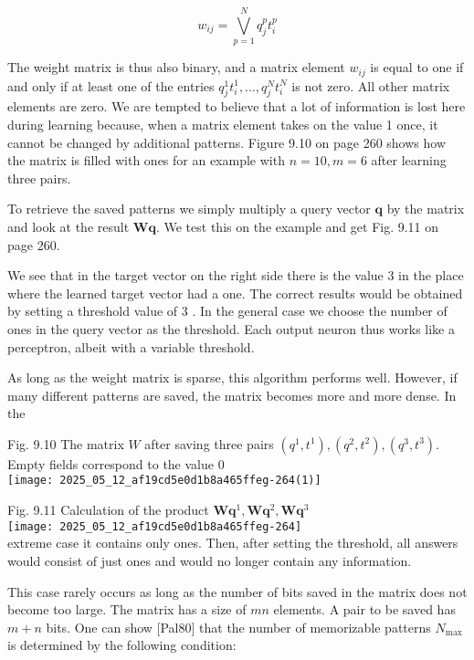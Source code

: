 \documentclass[10pt]{article}
\begin{document}
\begin{equation*}
w_{i j}=\bigvee_{p=1}^{N} q_{j}^{p} t_{i}^{p} \tag{9.10}
\end{equation*}


The weight matrix is thus also binary, and a matrix element $w_{i j}$ is equal to one if and only if at least one of the entries $q_{j}^{1} t_{i}^{1}, \ldots, q_{j}^{N} t_{i}^{N}$ is not zero. All other matrix elements are zero. We are tempted to believe that a lot of information is lost here during learning because, when a matrix element takes on the value 1 once, it cannot be changed by additional patterns. Figure 9.10 on page 260 shows how the matrix is filled with ones for an example with $n=10, m=6$ after learning three pairs.

To retrieve the saved patterns we simply multiply a query vector $\boldsymbol{q}$ by the matrix and look at the result $\boldsymbol{W} \boldsymbol{q}$. We test this on the example and get Fig. 9.11 on page 260.

We see that in the target vector on the right side there is the value 3 in the place where the learned target vector had a one. The correct results would be obtained by setting a threshold value of 3 . In the general case we choose the number of ones in the query vector as the threshold. Each output neuron thus works like a perceptron, albeit with a variable threshold.

As long as the weight matrix is sparse, this algorithm performs well. However, if many different patterns are saved, the matrix becomes more and more dense. In the

Fig. 9.10 The matrix $W$ after saving three pairs $\left(q^{1}, t^{1}\right),\left(q^{2}, t^{2}\right),\left(q^{3}, t^{3}\right)$. Empty fields correspond to the value 0\\
\texttt{[image: 2025\_05\_12\_af19cd5e0d1b8a465ffeg-264(1)]}

Fig. 9.11 Calculation of the product $\boldsymbol{W} \boldsymbol{q}^{1}, \boldsymbol{W} \boldsymbol{q}^{2}, \boldsymbol{W} \boldsymbol{q}^{3}$\\
\texttt{[image: 2025\_05\_12\_af19cd5e0d1b8a465ffeg-264]}\\
extreme case it contains only ones. Then, after setting the threshold, all answers would consist of just ones and would no longer contain any information.

This case rarely occurs as long as the number of bits saved in the matrix does not become too large. The matrix has a size of $m n$ elements. A pair to be saved has $m+n$ bits. One can show [Pal80] that the number of memorizable patterns $N_{\text {max }}$ is determined by the following condition:
\end{document}
